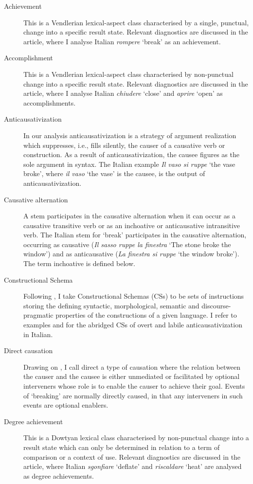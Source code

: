 \documentclass[output=paper,colorlinks,citecolor=brown
]{langscibook}
\begin{document}
\begin{description}
\item[Achievement] This is a Vendlerian   lexical-aspect class characterised by a single, punctual, change into a specific   result state. Relevant diagnostics are discussed in the article, where I   analyse Italian \textit{rompere} ‘break’ as an achievement.
\item[Accomplishment] This is a Vendlerian   lexical-aspect class characterised by non-punctual change into a specific result   state. Relevant diagnostics are discussed in the article, where I analyse Italian   \textit{chiudere} ‘close’ and \textit{aprire} ‘open’ as accomplishments.
\item[Anticausativization] In our analysis anticausativization   is a strategy of argument realization which suppresses, i.e., fills   silently, the causer of a causative verb or construction. As a result of anticausativization,   the causee figures as the sole argument in syntax. The Italian example \textit{Il   vaso si ruppe} ‘the vase broke’, where \textit{il vaso} ‘the vase’ is the   causee, is the output of anticausativization.
\item[Causative   alternation] A stem participates in the causative   alternation when it can occur as a causative transitive verb or as an   inchoative or anticausative intransitive verb. The Italian stem for ‘break’   participates in the causative alternation, occurring as causative (\textit{Il sasso   ruppe la finestra} ‘The stone broke the window’) and as anticausative (\textit{La   finestra si ruppe} ‘the window broke’). The term inchoative   is defined below.
\item[Constructional   Schema] Following \citet{vanvalin2023principles}, I   take Constructional Schemas (CSs) to be sets of instructions storing   the defining syntactic, morphological, semantic and discourse-pragmatic   properties of the constructions of a given language. I refer to examples    and  for the abridged CSs of overt and labile anticausativization in   Italian.
\item[Direct   causation] Drawing on \citet{wolff2003direct}, I call direct   a type of causation where the relation between the causer and the causee is   either unmediated or facilitated by optional interveners whose role is to   enable the causer to achieve their goal. Events of ‘breaking’ are normally   directly caused, in that any interveners in such events are optional   enablers.
\item[Degree   achievement] This is a Dowtyan lexical class   characterised by non-punctual change into a result state which can only be   determined in relation to a term of comparison or a context of use. Relevant   diagnostics are discussed in the article, where Italian \textit{sgonfiare}   ‘deflate’ and \textit{riscaldare} ‘heat’ are analysed as degree achievements.

\end{description}
\end{document}
